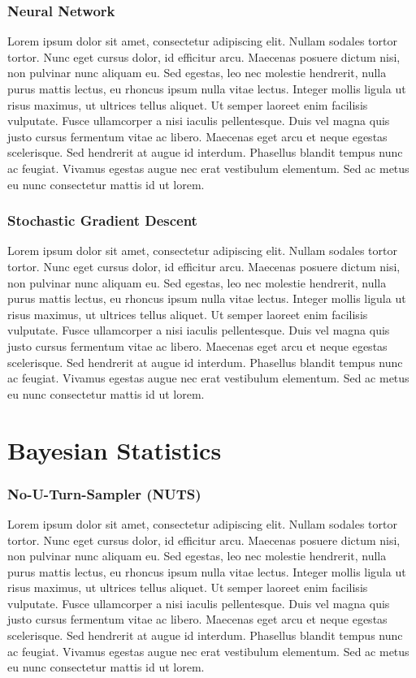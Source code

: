 \subsubsection{Neural Network}
Lorem ipsum dolor sit amet, consectetur adipiscing elit. Nullam sodales tortor tortor. Nunc eget cursus dolor, id efficitur arcu. Maecenas posuere dictum nisi, non pulvinar nunc aliquam eu. Sed egestas, leo nec molestie hendrerit, nulla purus mattis lectus, eu rhoncus ipsum nulla vitae lectus. Integer mollis ligula ut risus maximus, ut ultrices tellus aliquet. Ut semper laoreet enim facilisis vulputate. Fusce ullamcorper a nisi iaculis pellentesque. Duis vel magna quis justo cursus fermentum vitae ac libero. Maecenas eget arcu et neque egestas scelerisque. Sed hendrerit at augue id interdum. Phasellus blandit tempus nunc ac feugiat. Vivamus egestas augue nec erat vestibulum elementum. Sed ac metus eu nunc consectetur mattis id ut lorem.

\subsubsection{Stochastic Gradient Descent}
Lorem ipsum dolor sit amet, consectetur adipiscing elit. Nullam sodales tortor tortor. Nunc eget cursus dolor, id efficitur arcu. Maecenas posuere dictum nisi, non pulvinar nunc aliquam eu. Sed egestas, leo nec molestie hendrerit, nulla purus mattis lectus, eu rhoncus ipsum nulla vitae lectus. Integer mollis ligula ut risus maximus, ut ultrices tellus aliquet. Ut semper laoreet enim facilisis vulputate. Fusce ullamcorper a nisi iaculis pellentesque. Duis vel magna quis justo cursus fermentum vitae ac libero. Maecenas eget arcu et neque egestas scelerisque. Sed hendrerit at augue id interdum. Phasellus blandit tempus nunc ac feugiat. Vivamus egestas augue nec erat vestibulum elementum. Sed ac metus eu nunc consectetur mattis id ut lorem.

\section{Bayesian Statistics}

\subsubsection{No-U-Turn-Sampler (NUTS)}
Lorem ipsum dolor sit amet, consectetur adipiscing elit. Nullam sodales tortor tortor. Nunc eget cursus dolor, id efficitur arcu. Maecenas posuere dictum nisi, non pulvinar nunc aliquam eu. Sed egestas, leo nec molestie hendrerit, nulla purus mattis lectus, eu rhoncus ipsum nulla vitae lectus. Integer mollis ligula ut risus maximus, ut ultrices tellus aliquet. Ut semper laoreet enim facilisis vulputate. Fusce ullamcorper a nisi iaculis pellentesque. Duis vel magna quis justo cursus fermentum vitae ac libero. Maecenas eget arcu et neque egestas scelerisque. Sed hendrerit at augue id interdum. Phasellus blandit tempus nunc ac feugiat. Vivamus egestas augue nec erat vestibulum elementum. Sed ac metus eu nunc consectetur mattis id ut lorem.

